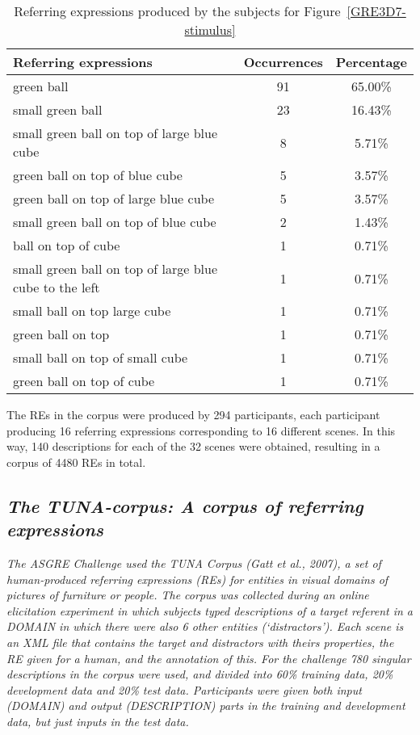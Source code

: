 \begin{table}[h!]
\begin{center}
\begin{tabular}{|l|c|c|}
\hline
Referring expressions & Occurrences & Percentage \\
\hline
green ball & 91 & 65.00\% \\
small green ball & 23 & 16.43\% \\
small green ball on top of large blue cube & 8 & 5.71\% \\
green ball on top of blue cube & 5 & 3.57\% \\
green ball on top of large blue cube & 5 & 3.57\% \\
small green ball on top of blue cube & 2 & 1.43\% \\
ball on top of cube & 1 & 0.71\% \\
small green ball on top of large blue cube to the left & 1 & 0.71\% \\
small ball on top large cube & 1 & 0.71\% \\
green ball on top & 1 & 0.71\% \\
small ball on top of small cube & 1 & 0.71\% \\
green ball on top of cube & 1 & 0.71\% \\
\hline
\end{tabular}
\caption{Referring expressions produced by the subjects for Figure~\ref{GRE3D7-stimulus}\label{corpus-distribution}}
\end{center}
\end{table}

The REs in the corpus were produced by 294 participants, each participant producing 16 referring expressions corresponding to 16 
different scenes. In this way, 140 descriptions for each of the 32 scenes were obtained, resulting in a corpus of 4480 REs in total. 


\subsection{\textit{The TUNA-corpus: A corpus of referring expressions}}
\label{sec:learningTUNA}

\textit{The ASGRE Challenge used the TUNA Corpus (Gatt
et al., 2007), a set of human-produced referring expressions (REs) for entities in visual domains of
pictures of furniture or people. The corpus was
collected during an online elicitation experiment in
which subjects typed descriptions of a target referent
in a DOMAIN in which there were also 6 other entities (‘distractors’). 
Each scene is an XML file that contains the target and distractors with theirs properties, the RE given for a human, and the annotation of this.   
For the challenge 780 singular descriptions in the corpus were used, and divided
into 60\% training data, 20\% development data and
20\% test data. Participants were given both input
(DOMAIN) and output (DESCRIPTION) parts in the
training and development data, but just inputs in the
test data.}



